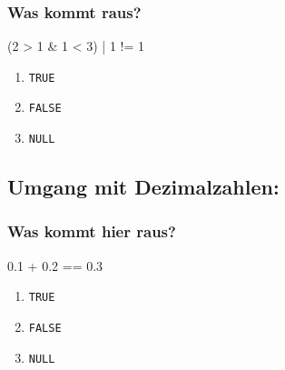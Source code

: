 \documentclass[
]{book}
\newenvironment{Shaded}{\begin{snugshade}}{\end{snugshade}}
\newcommand{\DecValTok}[1]{\textcolor[rgb]{0.00,0.00,0.81}{#1}}
\newcommand{\FloatTok}[1]{\textcolor[rgb]{0.00,0.00,0.81}{#1}}
\newcommand{\NormalTok}[1]{#1}
\newcommand{\SpecialCharTok}[1]{\textcolor[rgb]{0.00,0.00,0.00}{#1}}
\providecommand{\tightlist}{%
  \setlength{\itemsep}{0pt}\setlength{\parskip}{0pt}}
\begin{document}
\hypertarget{was-kommt-raus-1}{%
\subsubsection*{Was kommt raus?}\label{was-kommt-raus-1}}

\begin{Shaded}
\begin{Highlighting}[]
\NormalTok{(}\DecValTok{2} \SpecialCharTok{\textgreater{}} \DecValTok{1} \SpecialCharTok{\&} \DecValTok{1} \SpecialCharTok{\textless{}} \DecValTok{3}\NormalTok{) }\SpecialCharTok{|} \DecValTok{1} \SpecialCharTok{!=} \DecValTok{1}
\end{Highlighting}
\end{Shaded}

\begin{enumerate}
\def\labelenumi{\Alph{enumi})}
\tightlist
\item
  \texttt{TRUE}
\item
  \texttt{FALSE}
\item
  \texttt{NULL}
\end{enumerate}

\hypertarget{umgang-mit-dezimalzahlen}{%
\subsection*{Umgang mit Dezimalzahlen:}\label{umgang-mit-dezimalzahlen}}

\hypertarget{was-kommt-hier-raus}{%
\subsubsection*{Was kommt hier raus?}\label{was-kommt-hier-raus}}

\begin{Shaded}
\begin{Highlighting}[]
\FloatTok{0.1} \SpecialCharTok{+} \FloatTok{0.2} \SpecialCharTok{==} \FloatTok{0.3}
\end{Highlighting}
\end{Shaded}

\begin{enumerate}
\def\labelenumi{\Alph{enumi})}
\tightlist
\item
  \texttt{TRUE}
\item
  \texttt{FALSE}
\item
  \texttt{NULL}
\end{enumerate}
\end{document}
